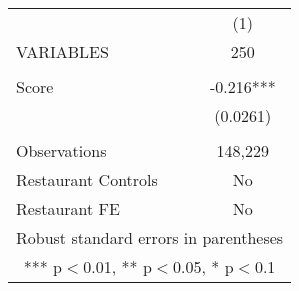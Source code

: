 \begin{tabular}{lc} \hline
 & (1) \\
VARIABLES & 250 \\ \hline
 &  \\
Score & -0.216*** \\
 & (0.0261) \\
 &  \\
Observations & 148,229 \\
Restaurant Controls & No \\
 Restaurant FE & No \\ \hline
\multicolumn{2}{c}{ Robust standard errors in parentheses} \\
\multicolumn{2}{c}{ *** p$<$0.01, ** p$<$0.05, * p$<$0.1} \\
\end{tabular}
